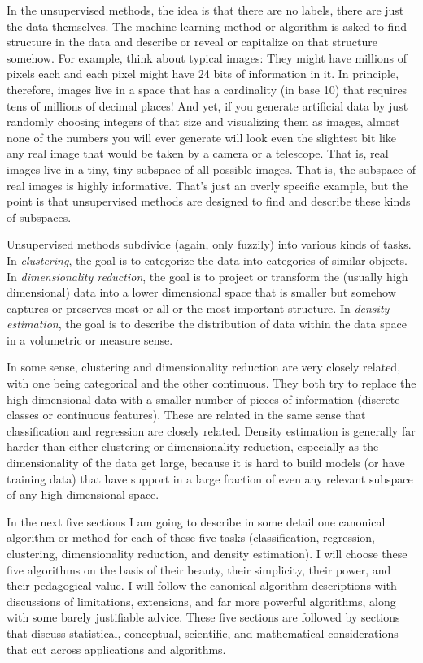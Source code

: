 \documentclass[12pt, letterpaper]{article}
\begin{document}
In the unsupervised methods, the idea is that there are no labels,
there are just the data themselves.
The machine-learning method or algorithm is asked to find
structure in the data and describe or reveal or capitalize on that
structure somehow.
For example, think about typical images: They might have millions
of pixels each and each pixel might have 24 bits of information in it.
In principle, therefore, images live in a space that has a cardinality
(in base 10) that requires tens of millions of decimal places!
And yet, if you generate artificial data by just randomly choosing
integers of that size and visualizing them as images, almost none of
the numbers you will ever generate will look even the slightest bit
like any real image that would be taken by a camera or a telescope.
That is, real images live in a tiny, tiny subspace of all possible
images.
That is, the subspace of real images is highly informative.
That's just an overly specific example, but the point is that
unsupervised methods are designed to find and describe these kinds of subspaces.

Unsupervised methods subdivide (again, only fuzzily) into various
kinds of tasks.
In \emph{clustering}, the goal is to categorize the data into categories
of similar objects.
In \emph{dimensionality reduction}, the goal is to project or
transform the (usually high dimensional) data into a lower dimensional
space that is smaller but somehow captures or preserves most or all or
the most important structure.
In \emph{density estimation}, the goal is to describe the distribution
of data within the data space in a volumetric or measure sense.

In some sense, clustering and dimensionality reduction are very closely
related, with one being categorical and the other continuous.
They both try to replace the high dimensional data with a smaller number of
pieces of information (discrete classes or continuous features).
These are related  in the
same sense that classification and regression are closely related.
Density estimation is generally far harder than either clustering
or dimensionality reduction, especially as the dimensionality of the
data get large, because it is hard to build models (or have training
data) that have support in a large fraction of even any relevant
subspace of any high dimensional space.

In the next five sections I am going to describe in some detail one
canonical algorithm or method for each of these five tasks
(classification, regression, clustering, dimensionality reduction,
and density estimation).
I will choose these five algorithms on the basis of their beauty, their
simplicity, their power, and their pedagogical value.
I will follow the canonical algorithm descriptions with discussions
of limitations, extensions, and far more powerful algorithms, along
with some barely justifiable advice.
These five sections are followed by sections that discuss statistical,
conceptual, scientific, and mathematical considerations that cut
across applications and algorithms.
\end{document}
